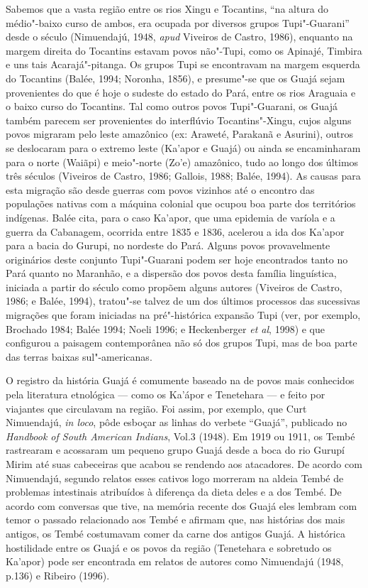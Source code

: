 Sabemos que a vasta região entre os rios Xingu e Tocantins, ``na altura
do médio"-baixo curso de ambos, era ocupada por diversos grupos
Tupi"-Guarani'' desde o século  (Nimuendajú, 1948, \emph{apud} Viveiros de
Castro, 1986), enquanto na margem direita do Tocantins estavam povos
não"-Tupi, como os Apinajé, Timbira e uns tais Acarajá"-pitanga. Os grupos
Tupi se encontravam na margem esquerda do Tocantins (Balée, 1994;
Noronha, 1856), e presume"-se que os Guajá sejam provenientes do que é
hoje o sudeste do estado do Pará, entre os rios Araguaia e o baixo curso
do Tocantins. Tal como outros povos Tupi"-Guarani, os Guajá também
parecem ser provenientes do interflúvio Tocantins"-Xingu, cujos alguns
povos migraram pelo leste amazônico (ex: Araweté, Parakanã e Asurini),
outros se deslocaram para o extremo leste (Ka'apor e Guajá) ou ainda se
encaminharam para o norte (Waiãpi) e meio"-norte (Zo'e) amazônico, tudo
ao longo dos últimos três séculos (Viveiros de Castro, 1986; Gallois,
1988; Balée, 1994). As causas para esta migração são desde guerras com
povos vizinhos até o encontro das populações nativas com a máquina
colonial que ocupou boa parte dos territórios indígenas. Balée cita,
para o caso Ka'apor, que uma epidemia de varíola e a guerra da
Cabanagem, ocorrida entre 1835 e 1836, acelerou a ida dos Ka'apor para a
bacia do Gurupi, no nordeste do Pará. Alguns povos provavelmente
originários deste conjunto Tupi"-Guarani podem ser hoje encontrados tanto
no Pará quanto no Maranhão, e a dispersão dos povos desta família
linguística, iniciada a partir do século  como propõem alguns
autores (Viveiros de Castro, 1986; e Balée, 1994), tratou"-se talvez de
um dos últimos processos das sucessivas migrações que foram iniciadas na
pré"-histórica expansão Tupi (ver, por exemplo, Brochado 1984; Balée
1994; Noeli 1996; e Heckenberger \emph{et al}, 1998) e que configurou a
paisagem contemporânea não só dos grupos Tupi, mas de boa parte das
terras baixas sul"-americanas.

O registro da história Guajá é comumente baseado na de povos mais
conhecidos pela literatura etnológica --- como os Ka'ápor e Tenetehara ---
e feito por viajantes que circulavam na região. Foi assim, por exemplo,
que Curt Nimuendajú, \emph{in loco}, pôde esboçar as linhas do verbete
``Guajá'', publicado no \emph{Handbook of South American Indians}, Vol.3
(1948). Em 1919 ou 1911, os Tembé rastrearam e acossaram um pequeno
grupo Guajá desde a boca do rio Gurupí Mirim até suas cabeceiras que
acabou se rendendo aos atacadores. De acordo com Nimuendajú, segundo
relatos esses cativos logo morreram na aldeia Tembé de problemas
intestinais atribuídos à diferença da dieta deles e a dos Tembé. De
acordo com conversas que tive, na memória recente dos Guajá eles lembram
com temor o passado relacionado aos Tembé e afirmam que, nas histórias
dos mais antigos, os Tembé costumavam comer da carne dos antigos Guajá.
A histórica hostilidade entre os Guajá e os povos da região (Tenetehara
e sobretudo os Ka'apor) pode ser encontrada em relatos de autores como
Nimuendajú (1948, p.136) e Ribeiro (1996).

